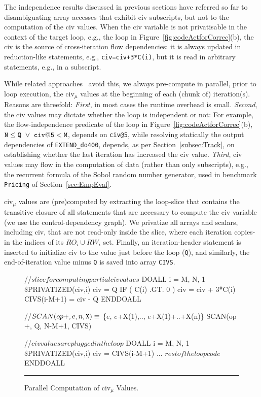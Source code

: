 \documentclass{sig-alternate}
\newcommand{\mymath}[1]{$ #1 $}
\begin{document}
The independence results discussed in previous sections have referred 
so far to disambiguating array accesses that exhibit {\sc civ} 
subscripts, but not to the computation of the {\sc civ} values.
%
When the {\sc civ} variable is not privatisable in the context of the 
target loop, e.g., the loop in Figure~\ref{fig:codeActforCorrec}(b), 
the {\sc civ} is the source of cross-iteration flow dependencies: %
it is always updated in reduction-like statements, e.g., {\tt civ=civ+3*C(i)},
but it is read in arbitrary statements, e.g., in a subscript.


While related approaches~\cite{PaduaDemDrInterproc,VEG} avoid this, we always pre-compute in
parallel, prior to loop execution, the {\sc civ}$_\mu$ values at the beginning 
of each (chunk of) iteration(s).
Reasons are threefold: {\em First}, in most cases %
the runtime overhead is small. {\em Second}, the {\sc civ} values may dictate
whether the loop is independent or not: For example,  the flow-independence
predicate of the loop in Figure~\ref{fig:codeActforCorrec}(b), 
${\tt N} \le {\tt Q}~\vee~{\tt civ@5} < {\tt M}$,
depends on {\tt civ@5}, while resolving statically the output 
dependencies of {\tt EXTEND\_do400}, depends, as
per Section~\ref{subsec:Track}, on establishing whether the last
iteration has increased the {\sc civ} value. 
%
{\em Third}, {\sc civ} values may flow in the computation
of data (rather than only subscripts), e.g., the recurrent
formula of the Sobol random number generator, used in
benchmark {\tt Pricing}  of Section~\ref{sec:EmpEval}.

{\sc civ}$_\mu$ values are (pre)computed by extracting the loop-slice
that contains the transitive closure of all statements 
that are necessary to compute the {\sc civ} variable
(we use the control-dependency graph). 
We privatize all arrays and scalars, including {\sc civ}, that are not 
read-only inside the slice, where each iteration copies-in the  indices 
of its $RO_i \cup RW_i$ set. Finally, an iteration-header statement is 
inserted to initialize {\sc civ} to the value just before the loop ({\tt Q}), 
and similarly, the end-of-iteration value minus {\tt Q} is saved into array 
{\tt CIVS}.  


\begin{figure}
\begin{colorcode}
//\mymath{slice for computing partial civ values}
DOALL i = M, N, 1      \$PRIVATIZED(civ,i)
  civ = Q
  IF ( C(i) .GT. 0 ) civ = civ + 3*C(i)
  CIVS(i-M+1) = civ - Q
ENDDOALL

//\mymath{SCAN(op {\tt{}+}, e, n, {\tt{}X}) \equiv} \{\mymath{e}, \mymath{e}+X(1),.., \mymath{e}+X(1)+..+X(n)\}
SCAN(op +, Q, N-M+1, CIVS)

//\mymath{civ values are plugged in the loop} 
DOALL i = M, N, 1      \$PRIVATIZED(civ,i)
  civ = CIVS(i-M+1)
  ... \mymath{rest of the loop code} 
ENDDOALL
\end{colorcode}
\vspace{-1ex}
\hrule
\vspace{-0.5ex}
\caption{ Parallel Computation of {\sc civ}$_\mu$ Values.}
\label{fig:CivSlice} %
\end{figure}
\end{document}
